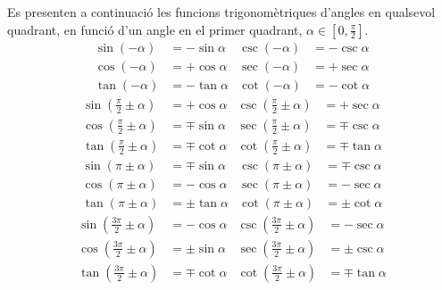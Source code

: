  Es presenten a continuació  les funcions trigonomètriques d'angles en qualsevol
quadrant, en funció d'un angle en el primer quadrant,
$\alpha\in[0,\frac{\pi}{2}]$.
\begin{subequations}
\begin{align}
    \sin(-\alpha) &= -\sin\alpha  & \csc(-\alpha) &= -\csc\alpha \\[1.5ex]
    \cos(-\alpha) &= +\cos\alpha  & \sec(-\alpha) &= +\sec\alpha \\[1.5ex]
    \tan(-\alpha) &= -\tan\alpha  & \cot(-\alpha) &= -\cot\alpha
\end{align}
\end{subequations}
\vspace{-5mm}
\begin{subequations}
\begin{align}
    \sin\left(\frac{\pi}{2}\pm\alpha\right) &= +\cos\alpha    & \csc\left(\frac{\pi}{2}\pm\alpha\right) &= +\sec\alpha \\
    \cos\left(\frac{\pi}{2}\pm\alpha\right) &= \mp\sin\alpha  & \sec\left(\frac{\pi}{2}\pm\alpha\right) &= \mp\csc\alpha \\
    \tan\left(\frac{\pi}{2}\pm\alpha\right) &= \mp\cot\alpha  & \cot\left(\frac{\pi}{2}\pm\alpha\right) &= \mp\tan\alpha
\end{align}
\end{subequations}
\vspace{-5mm}
\begin{subequations}
\begin{align}
    \sin(\pi\pm\alpha) &= \mp\sin\alpha  & \csc(\pi\pm\alpha) &= \mp\csc\alpha \\[1.5ex]
    \cos(\pi\pm\alpha) &= -\cos\alpha    & \sec(\pi\pm\alpha) &= -\sec\alpha \\[1.5ex]
    \tan(\pi\pm\alpha) &= \pm\tan\alpha  & \cot(\pi\pm\alpha) &= \pm\cot\alpha
\end{align}
\end{subequations}
\vspace{-5mm}
\begin{subequations}
\begin{align}
    \sin\left(\frac{3\pi}{2}\pm\alpha\right) &= -\cos\alpha    & \csc\left(\frac{3\pi}{2}\pm\alpha\right) &= -\sec\alpha \\
    \cos\left(\frac{3\pi}{2}\pm\alpha\right) &= \pm\sin\alpha  & \sec\left(\frac{3\pi}{2}\pm\alpha\right) &= \pm\csc\alpha \\
    \tan\left(\frac{3\pi}{2}\pm\alpha\right) &= \mp\cot\alpha  & \cot\left(\frac{3\pi}{2}\pm\alpha\right) &= \mp\tan\alpha
\end{align}
\end{subequations}
